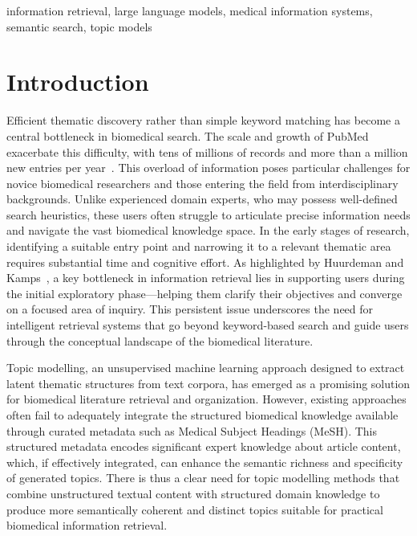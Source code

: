\documentclass[authorproof,JACIII,researchpaper]{fujipressarticle}
\begin{document}
\begin{keywords}
{\color{red}information retrieval, large language models, medical information systems, semantic search, topic models}
\end{keywords}

\section{Introduction}
\label{sec:introduction}
Efficient thematic discovery rather than simple keyword matching has become a central bottleneck in biomedical search. {\color{red}The scale and growth of PubMed exacerbate this difficulty, with tens of millions of records and more than a million new entries per year~\cite{jin_pubmed_2024}.} This overload of information poses particular challenges for novice biomedical researchers and those entering the field from interdisciplinary backgrounds. Unlike experienced domain experts, who may possess well-defined search heuristics, these users often struggle to articulate precise information needs and navigate the vast biomedical knowledge space. {\color{red}In the early stages of research, identifying a suitable entry point and narrowing it to a relevant thematic area requires substantial time and cognitive effort.} {\color{red}As highlighted by Huurdeman and Kamps~\cite{fu_designing_2020}, a key bottleneck in information retrieval lies in supporting users during the initial exploratory phase---helping them clarify their objectives and converge on a focused area of inquiry.} {\color{red}This persistent issue underscores the need for intelligent retrieval systems that go beyond keyword-based search and guide users through the conceptual landscape of the biomedical literature.}

Topic modelling, an unsupervised machine learning approach designed to extract latent thematic structures from text corpora, has emerged as a promising solution for biomedical literature retrieval and organization. However, existing approaches often fail to adequately integrate the structured biomedical knowledge available through curated metadata such as Medical Subject Headings (MeSH). {\color{red}This structured metadata encodes significant expert knowledge about article content, which, if effectively integrated, can enhance the semantic richness and specificity of generated topics.} {\color{red}There is thus a clear need for topic modelling methods that combine unstructured textual content with structured domain knowledge to produce more semantically coherent and distinct topics suitable for practical biomedical information retrieval.}
\end{document}
